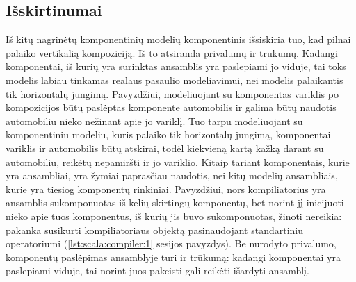 \subsection{Išskirtinumai}

Iš kitų \cite{classification-framework-for-scm} nagrinėtų komponentinių
modelių  komponentinis išsiskiria tuo, kad
pilnai palaiko vertikalią kompoziciją. Iš to atsiranda privalumų
ir trūkumų. Kadangi komponentai, iš kurių yra surinktas ansamblis
yra paslepiami jo viduje, tai toks modelis labiau tinkamas realaus
pasaulio modeliavimui, nei modelis palaikantis tik horizontalų jungimą.
Pavyzdžiui, modeliuojant su  komponentas variklis po
kompozicijos būtų paslėptas komponente automobilis ir galima būtų
naudotis automobiliu nieko nežinant apie jo variklį. Tuo tarpu
modeliuojant su komponentiniu modeliu, kuris palaiko tik horizontalų
jungimą, komponentai variklis ir automobilis būtų atskirai, todėl
kiekvieną kartą kažką darant su automobiliu, reikėtų nepamiršti
ir jo variklio. Kitaip tariant  komponentais, kurie
yra ansambliai, yra žymiai paprasčiau naudotis, nei kitų modelių
ansambliais, kurie yra tiesiog komponentų rinkiniai. Pavyzdžiui,
nors  kompiliatorius yra ansamblis sukomponuotas
iš kelių skirtingų komponentų, bet norint jį inicijuoti nieko apie
tuos komponentus, iš kurių jis buvo sukomponuotas, žinoti nereikia:
pakanka susikurti kompiliatoriaus objektą pasinaudojant standartiniu
 operatoriumi (\ref{lst:scala:compiler:1} 
sesijos pavyzdys). Be nurodyto privalumo, komponentų paslėpimas
ansamblyje turi ir trūkumą: kadangi komponentai yra paslepiami viduje,
tai norint juos pakeisti gali reikėti išardyti ansamblį.

\begin{scalainterpreterlisting}
  \label{lst:scala:compiler:1}
\end{scalainterpreterlisting}

